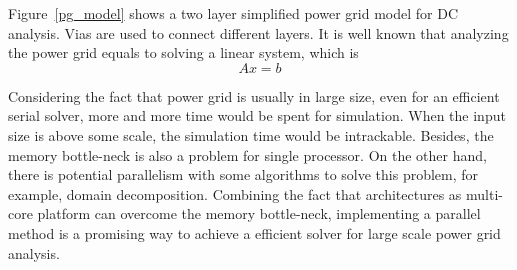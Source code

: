 \documentclass{sig-alternate}
\begin{document}
	Figure~\ref{pg_model} shows a two layer simplified power grid model for DC analysis. Vias are used to 
	connect different layers. It is well known that analyzing the power grid equals to solving a linear system, which is 
	\begin{equation}\label{eq1}
		Ax=b
	\end{equation}
\begin{comment}
	There are several serial simulation techniques developed to solve Equation \eqref{eq1}, including multigrid\cite{kozhaya}, 
	PCG\cite{Tsung-Hao}, random walks\cite{Boghrati}, domain-decomposition\cite{Quming,Zhongyu}, and so on. Random walks 
	is a stastical based method, and is only efficient for simulating a small subset of nodes, for eg., several thousand nodes.
	When it comes to the whole grid, it will either be time consuming to get solution, or will introduce error. The problems
	will deteriorate for larger size power grid with only a few number of VDD/GND sources. Besides, when modeling with vias, 
	this method can be trapped by vias, result in no convergence. PCG method in\cite{Tsung-Hao} is known as the fastest 
	linear solver 
	for large symmetric partial differential equations. But the total performance depends on the number of iterations. If the
	system is well-conditioned, only a few iterations are needed for convergence. In this case, due to larger effort per iteration
	for PCG than other simpler methods such as Gauss-sidel, as well as the fact that PCG consumes more memory, the total 
	performance of PCG may not be better than other simpler methods.
	
	Multigrid method achieves near linear simulation time with input size. The fine grid is recursively restricted into coarse ones 
	and the solution from coarse grids will be interpolated back into fine ones. Because of restriction and interpolation, 
	only approximate solution can be obtained. The error can be intractable for large or ill-conditioned system. Domain 
	decomposition is based on the idea of ``divide and conquer". 
	There are two kinds of domain decomposition(DD): Schur Complement DD (SCM) and Additive Schwarz DD (ASM). The main difference 
	is that Shur 
	Complement DD partitions find grid into subdomains with a common interface, while in Additive Schwarz DD, there is no 
	interface between subdomains. For SCM, 
	the dense characteristic of schur matrix limits the interface size to be small. As a result, this method can not solve too 
	large problems at low cost.
\end{comment}
	Considering the fact that power grid is usually in large size, even for an efficient serial solver, more and more time would be
	spent for simulation. When the input size is above some scale, the simulation time would be intrackable.
	Besides, the memory bottle-neck is also a problem for single processor. On the other hand, there is potential parallelism with
	some algorithms to solve this problem, for example, domain decomposition. Combining the fact that architectures as multi-core platform 
	can overcome the memory bottle-neck, implementing a parallel method is a promising way to achieve a efficient solver for 
	large scale power grid analysis. 
\end{document}

